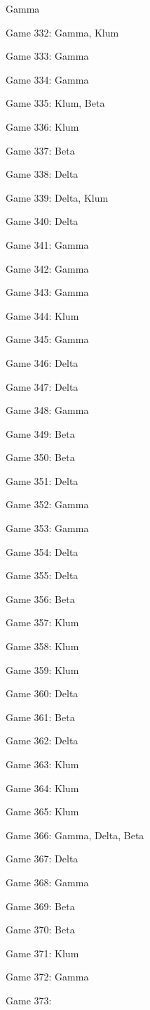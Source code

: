 \documentclass{article}
\begin{document}
\begin{multicols}{3}
\begin{compactitem}
Gamma
\item Game 332:
Gamma, Klum
\item Game 333:
Gamma
\item Game 334:
Gamma
\item Game 335:
Klum, Beta
\item Game 336:
Klum
\item Game 337:
Beta
\item Game 338:
Delta
\item Game 339:
Delta, Klum
\item Game 340:
Delta
\item Game 341:
Gamma
\item Game 342:
Gamma
\item Game 343:
Gamma
\item Game 344:
Klum
\item Game 345:
Gamma
\item Game 346:
Delta
\item Game 347:
Delta
\item Game 348:
Gamma
\item Game 349:
Beta
\item Game 350:
Beta
\item Game 351:
Delta
\item Game 352:
Gamma
\item Game 353:
Gamma
\item Game 354:
Delta
\item Game 355:
Delta
\item Game 356:
Beta
\item Game 357:
Klum
\item Game 358:
Klum
\item Game 359:
Klum
\item Game 360:
Delta
\item Game 361:
Beta
\item Game 362:
Delta
\item Game 363:
Klum
\item Game 364:
Klum
\item Game 365:
Klum
\item Game 366:
Gamma, Delta, Beta
\item Game 367:
Delta
\item Game 368:
Gamma
\item Game 369:
Beta
\item Game 370:
Beta
\item Game 371:
Klum
\item Game 372:
Gamma
\item Game 373:

\end{compactitem}
\end{multicols}
\end{document}
